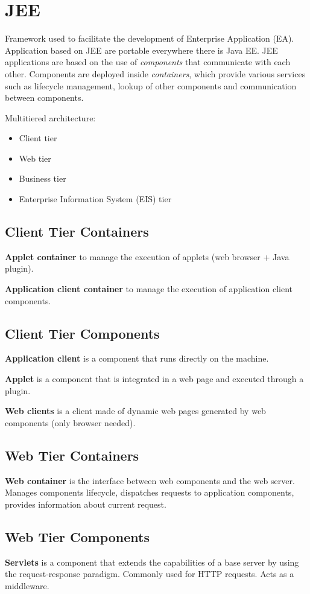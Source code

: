 \section{JEE}
Framework used to facilitate the development of Enterprise Application (EA).
Application based on JEE are portable everywhere there is Java EE.
JEE applications are based on the use of \emph{components} that communicate with each other.
Components are deployed inside \emph{containers}, which provide various services such as lifecycle management, lookup of other components and communication between components.

Multitiered architecture:
\begin{itemize}
    \item Client tier
    \item Web tier
    \item Business tier
    \item Enterprise Information System (EIS) tier
\end{itemize}

\subsection{Client Tier Containers}
\textbf{Applet container} to manage the execution of applets (web browser + Java plugin).

\textbf{Application client container} to manage the execution of application client components.

\subsection{Client Tier Components}
\textbf{Application client} is a component that runs directly on the machine.

\textbf{Applet} is a component that is integrated in a web page and executed through a plugin.

\textbf{Web clients} is a client made of dynamic web pages generated by web components (only browser needed).

\subsection{Web Tier Containers}
\textbf{Web container} is the interface between web components and the web server. Manages components lifecycle, dispatches requests to application components, provides information about current request.

\subsection{Web Tier Components}
\textbf{Servlets} is a component that extends the capabilities of a base server by using the request-response paradigm. Commonly used for HTTP requests. Acts as a middleware.

